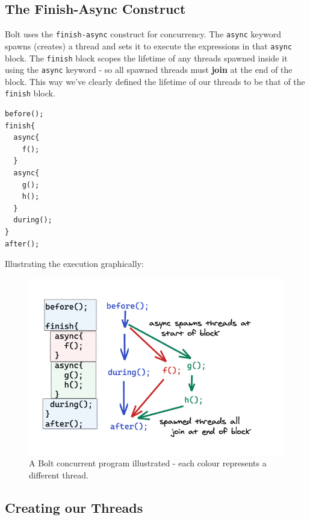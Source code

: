 \hypertarget{the-finish-async-construct}{%
\subsection{\texorpdfstring{\protect\hyperlink{the-finish-async-construct}{}The
Finish-Async
Construct}{The Finish-Async Construct}}\label{the-finish-async-construct}}

Bolt uses the \texttt{finish-async} construct for concurrency. The
\texttt{async} keyword spawns (creates) a thread and sets it to execute
the expressions in that \texttt{async} block. The \texttt{finish} block
scopes the lifetime of any threads spawned inside it using the
\texttt{async} keyword - so all spawned threads must \textbf{join} at
the end of the block. This way we've clearly defined the lifetime of our
threads to be that of the \texttt{finish} block.




\begin{lstlisting}[caption={{example\_concurrent\_program.bolt}}]
before();
finish{
  async{
    f();
  }
  async{
    g();
    h();
  }
  during();
}
after();
\end{lstlisting}

Illustrating the execution graphically:

\begin{figure}
\centering
\includegraphics[width=\linewidth]{09_files/finish-async.png}
\caption{A Bolt concurrent program illustrated - each colour represents
a different thread.}
\end{figure}

\hypertarget{creating-our-threads}{%
\subsection{\texorpdfstring{\protect\hyperlink{creating-our-threads}{}Creating
our Threads}{Creating our Threads}}\label{creating-our-threads}}

